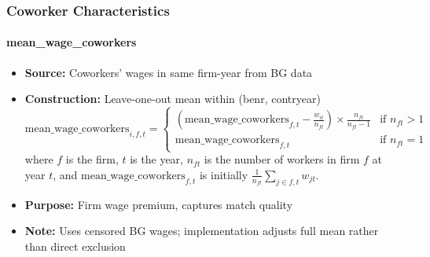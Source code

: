 \documentclass{article}
\begin{document}
\subsubsection{Coworker Characteristics}

\paragraph{mean\_wage\_coworkers}
\begin{itemize}
    \item \textbf{Source:} Coworkers' wages in same firm-year from BG data
    \item \textbf{Construction:} Leave-one-out mean within (benr, contryear)
    \begin{equation}
        \text{mean\_wage\_coworkers}_{i,f,t} = \begin{cases}
            (\text{mean\_wage\_coworkers}_{f,t} - \frac{w_{it}}{n_{ft}}) \times \frac{n_{ft}}{n_{ft}-1} & \text{if } n_{ft} > 1\\
            \text{mean\_wage\_coworkers}_{f,t} & \text{if } n_{ft} = 1
        \end{cases}
    \end{equation}
    where $f$ is the firm, $t$ is the year, $n_{ft}$ is the number of workers in firm $f$ at year $t$, and $\text{mean\_wage\_coworkers}_{f,t}$ is initially $\frac{1}{n_{ft}}\sum_{j \in f,t} w_{jt}$.
    \item \textbf{Purpose:} Firm wage premium, captures match quality
    \item \textbf{Note:} Uses censored BG wages; implementation adjusts full mean rather than direct exclusion
\end{itemize}
\end{document}

